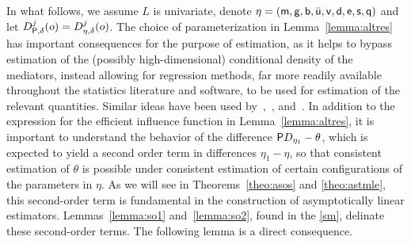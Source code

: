 In what follows, we assume $L$ is univariate, denote $\eta = (\m, \g, \b,
\bar\uu, \vv, \d, \e, \s, \q)$ and let $D_{\P,\delta}^j(o)
= D_{\eta,\delta}^j(o)$. The choice of parameterization in
Lemma~\ref{lemma:altres} has important consequences for the purpose of
estimation, as it helps to bypass estimation of the (possibly high-dimensional)
conditional density of the mediators, instead allowing for regression methods,
far more readily available throughout the statistics literature and software, to
be used for estimation of the relevant quantities. Similar ideas have been used
by~\citet{zheng2017longitudinal},~\citet{diaz2020causal},
and~\citet{diaz2020nonparametric}. In addition to the expression for the
efficient influence function in Lemma~\ref{lemma:altres}, it is important to
understand the behavior of the difference $\P D_{\eta_1} - \theta$, which is
expected to yield a second order term in differences $\eta_1-\eta$, so that
consistent estimation of $\theta$ is possible under consistent estimation of
certain configurations of the parameters in $\eta$. As we will see in
Theorems~\ref{theo:asos} and \ref{theo:astmle}, this second-order term is
fundamental in the construction of asymptotically linear estimators.
Lemmas~\ref{lemma:so1} and~\ref{lemma:so2}, found in the
\ref{sm}, delinate these second-order terms. The
following lemma is a direct consequence.

